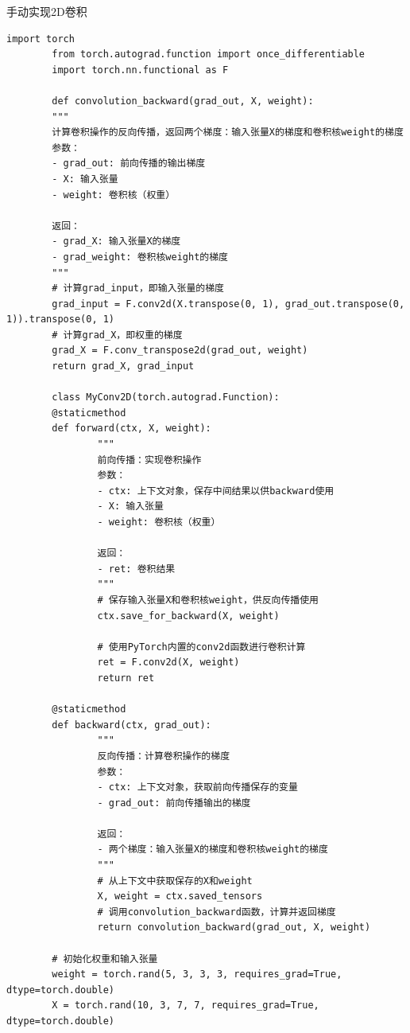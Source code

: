 \begin{example}
        \exProblem
        手动实现2D卷积
        \exSolution
        \begin{lstlisting}[style=pythonstyle]
        import torch
        from torch.autograd.function import once_differentiable
        import torch.nn.functional as F

        def convolution_backward(grad_out, X, weight):
        """
        计算卷积操作的反向传播，返回两个梯度：输入张量X的梯度和卷积核weight的梯度
        参数：
        - grad_out: 前向传播的输出梯度
        - X: 输入张量
        - weight: 卷积核（权重）
        
        返回：
        - grad_X: 输入张量X的梯度
        - grad_weight: 卷积核weight的梯度
        """
        # 计算grad_input，即输入张量的梯度
        grad_input = F.conv2d(X.transpose(0, 1), grad_out.transpose(0, 1)).transpose(0, 1)
        # 计算grad_X，即权重的梯度
        grad_X = F.conv_transpose2d(grad_out, weight)
        return grad_X, grad_input

        class MyConv2D(torch.autograd.Function):
        @staticmethod
        def forward(ctx, X, weight):
                """
                前向传播：实现卷积操作
                参数：
                - ctx: 上下文对象，保存中间结果以供backward使用
                - X: 输入张量
                - weight: 卷积核（权重）
                
                返回：
                - ret: 卷积结果
                """
                # 保存输入张量X和卷积核weight，供反向传播使用
                ctx.save_for_backward(X, weight)

                # 使用PyTorch内置的conv2d函数进行卷积计算
                ret = F.conv2d(X, weight)
                return ret

        @staticmethod
        def backward(ctx, grad_out):
                """
                反向传播：计算卷积操作的梯度
                参数：
                - ctx: 上下文对象，获取前向传播保存的变量
                - grad_out: 前向传播输出的梯度
                
                返回：
                - 两个梯度：输入张量X的梯度和卷积核weight的梯度
                """
                # 从上下文中获取保存的X和weight
                X, weight = ctx.saved_tensors
                # 调用convolution_backward函数，计算并返回梯度
                return convolution_backward(grad_out, X, weight)

        # 初始化权重和输入张量
        weight = torch.rand(5, 3, 3, 3, requires_grad=True, dtype=torch.double)
        X = torch.rand(10, 3, 7, 7, requires_grad=True, dtype=torch.double)


\end{lstlisting}
\end{example}
